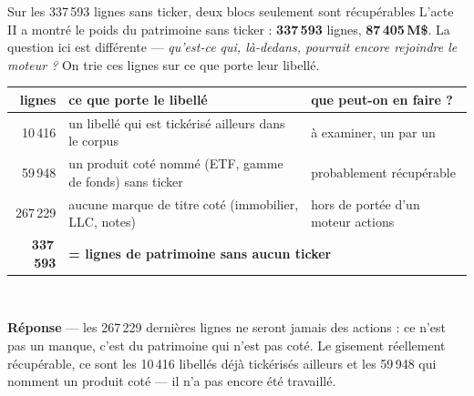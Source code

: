\documentclass[11pt,aspectratio=169]{beamer}
\newcommand{\repband}[1]{%
  \colorbox{okgreen!12}{\parbox{\dimexpr\textwidth-10pt}{\scriptsize
    \textbf{\textcolor{okgreen}{Réponse}}\; --- #1}}}
\begin{document}
\begin{frame}{Sur les 337\,593 lignes sans ticker, deux blocs seulement sont récupérables}
  \centering
  {\footnotesize L'acte II a montré le poids du patrimoine sans ticker : \textbf{337\,593} lignes,
  \textbf{87\,405\,M\$}. La question ici est différente --- \emph{qu'est-ce qui, là-dedans, pourrait
  encore rejoindre le moteur ?} On trie ces lignes sur ce que porte leur libellé.}\\[4mm]
  {\footnotesize\begin{tabular}{r l l}
    \toprule
    lignes & ce que porte le libellé & que peut-on en faire ?\\
    \midrule
    10\,416  & un libellé qui est tickérisé ailleurs dans le corpus & à examiner, un par un\\
    59\,948  & un produit coté nommé (ETF, gamme de fonds) sans ticker & probablement récupérable\\
    267\,229 & aucune marque de titre coté (immobilier, LLC, notes) & hors de portée d'un moteur actions\\
    \midrule
    \textbf{337\,593} & \multicolumn{2}{l}{\textbf{= lignes de patrimoine sans aucun ticker}}\\
    \bottomrule
  \end{tabular}}\\[4mm]
  \repband{les 267\,229 dernières lignes ne seront jamais des actions : ce n'est pas un manque,
  c'est du patrimoine qui n'est pas coté. Le gisement réellement récupérable, ce sont les 10\,416
  libellés déjà tickérisés ailleurs et les 59\,948 qui nomment un produit coté --- il n'a pas
  encore été travaillé.}
\end{frame}
\end{document}
